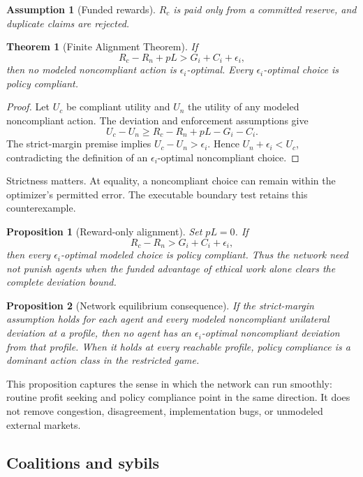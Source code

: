 \documentclass[11pt]{article}
\newtheorem{theorem}{Theorem}
\newtheorem{proposition}{Proposition}
\newtheorem{assumption}{Assumption}
\begin{document}
\begin{assumption}[Funded rewards]
$R_c$ is paid only from a committed reserve, and duplicate claims are rejected.
\end{assumption}

\begin{theorem}[Finite Alignment Theorem]
If
\[
  R_c-R_n+pL > G_i+C_i+\epsilon_i,
\]
then no modeled noncompliant action is $\epsilon_i$-optimal.  Every
$\epsilon_i$-optimal choice is policy compliant.
\end{theorem}

\begin{proof}
Let $U_c$ be compliant utility and $U_n$ the utility of any modeled
noncompliant action.  The deviation and enforcement assumptions give
\[
  U_c-U_n \ge R_c-R_n+pL-G_i-C_i.
\]
The strict-margin premise implies $U_c-U_n>\epsilon_i$.  Hence
$U_n+\epsilon_i<U_c$, contradicting the definition of an
$\epsilon_i$-optimal noncompliant choice.
\end{proof}

Strictness matters.  At equality, a noncompliant choice can remain within the
optimizer's permitted error.  The executable boundary test retains this
counterexample.

\begin{proposition}[Reward-only alignment]
Set $pL=0$.  If
\[
  R_c-R_n > G_i+C_i+\epsilon_i,
\]
then every $\epsilon_i$-optimal modeled choice is policy compliant.  Thus the
network need not punish agents when the funded advantage of ethical work alone
clears the complete deviation bound.
\end{proposition}

\begin{proposition}[Network equilibrium consequence]
If the strict-margin assumption holds for each agent and every modeled
noncompliant unilateral deviation at a profile, then no agent has an
$\epsilon_i$-optimal noncompliant deviation from that profile.  When it holds
at every reachable profile, policy compliance is a dominant action class in the
restricted game.
\end{proposition}

This proposition captures the sense in which the network can run smoothly:
routine profit seeking and policy compliance point in the same direction.
It does not remove congestion, disagreement, implementation bugs, or
unmodeled external markets.

\subsection{Coalitions and sybils}
\end{document}
